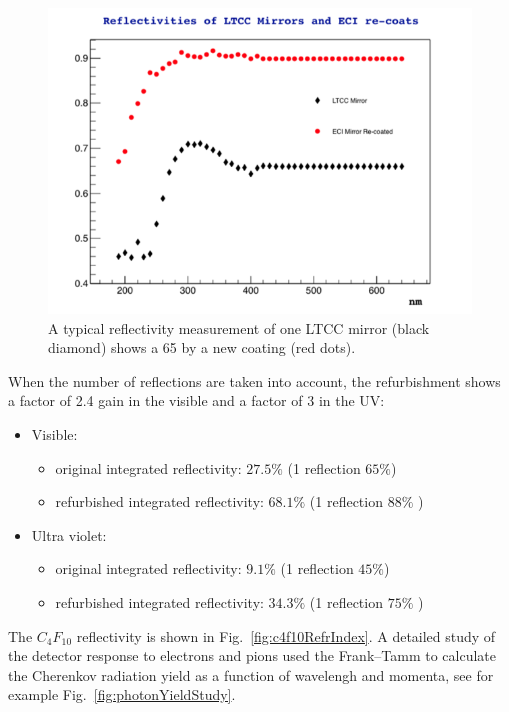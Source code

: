 \begin{figure}[h]
	\centering
	\includegraphics[width=1.0\columnwidth,keepaspectratio]{img/reflectivityGain.png}
	\caption{A typical reflectivity measurement of one LTCC mirror (black diamond) shows a 65%
		      by a new coating (red dots). }
	\label{fig:reflectivityGain}
\end{figure}

When the number of reflections are taken into account, the refurbishment shows
a factor of 2.4 gain in the visible and a factor of 3 in the UV:

\begin{itemize}
	\item Visible:
	\begin{itemize}
		\item original integrated reflectivity: $27.5\%$ (1 reflection $65\%$)
		\item refurbished integrated reflectivity: $68.1\%$  (1 reflection $88\%$ )
	\end{itemize}
	\item Ultra violet:
	\begin{itemize}
		\item original integrated reflectivity: $9.1\%$ (1 reflection $45\%$)
		\item refurbished integrated reflectivity: $34.3\%$  (1 reflection $75\%$ )
	\end{itemize}
\end{itemize}

The $C_4F_{10}$ reflectivity is shown in Fig.~\ref{fig:c4f10RefrIndex}. A detailed study of the detector response to electrons and pions used the Frank–Tamm to calculate
the Cherenkov radiation yield as a function of wavelengh and momenta, see for example Fig.~\ref{fig:photonYieldStudy}.


